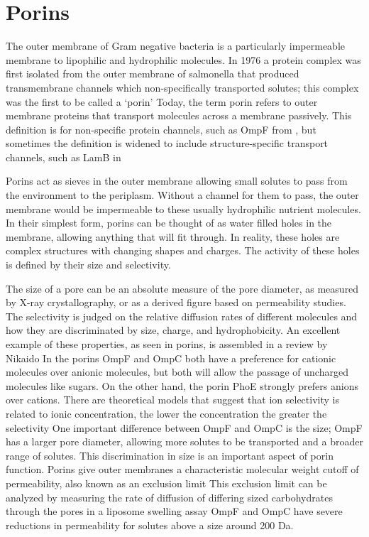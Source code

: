   \section{Porins} \label{sec:intro-porins}
 
The outer membrane of Gram negative bacteria is a particularly impermeable membrane to lipophilic and hydrophilic molecules. In 1976 a protein complex was first isolated from the
outer membrane of \ac{salmonella} that produced transmembrane channels which non-specifically transported solutes; this complex was the first to be called a
`porin' Today, the term porin refers to outer membrane proteins that transport molecules across a membrane passively. This definition is for non-specific
protein channels, such as OmpF from \ecoli{}, but sometimes the definition is widened to include structure-specific transport channels, such as LamB
in \ecoli{}

Porins act as sieves in the outer membrane allowing small solutes to pass from the environment to the periplasm. Without a channel for them to pass, the outer membrane would be
impermeable to these usually hydrophilic nutrient molecules. In their simplest form, porins can be thought of as water filled holes in the membrane, allowing anything that will fit
through. In reality, these holes are complex structures with changing shapes and charges. The activity of these holes is defined by their size and selectivity.

The size of a pore can be an absolute measure of the pore diameter, as measured by X-ray crystallography, or as a derived figure based on permeability studies. The selectivity is
judged on the relative diffusion rates of different molecules and how they are discriminated by size, charge, and hydrophobicity. An excellent example of these properties, as seen
in \ecoli{} porins, is assembled in a review by Nikaido In \ecoli{} the porins OmpF and OmpC both have a preference for cationic molecules over
anionic molecules, but both will allow the passage of uncharged molecules like sugars. On the other hand, the \ecoli{} porin PhoE strongly prefers anions over cations. There are
theoretical models that suggest that ion selectivity is related to ionic concentration, the lower the concentration the greater the selectivity One important
difference between OmpF and OmpC is the size; OmpF has a larger pore diameter, allowing more solutes to be transported and a broader range of solutes. This discrimination in size
is an important aspect of porin function. Porins give outer membranes a characteristic molecular weight cutoff of permeability, also known as an exclusion
limit This exclusion limit can be analyzed by measuring the rate of diffusion of differing sized carbohydrates through the pores in a liposome swelling
assay OmpF and OmpC have severe reductions in permeability for solutes above a size around 200 Da.
 
